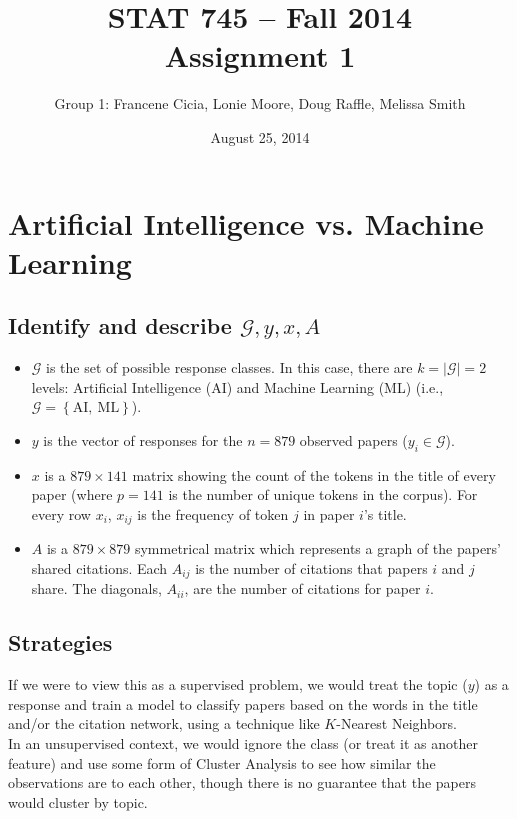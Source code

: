 \documentclass[a4paper]{article}
\title{\vspace{-30pt}STAT 745 -- Fall 2014\\Assignment 1}
\author{Group 1: Francene Cicia, Lonie Moore, Doug Raffle, Melissa Smith}
\date{August 25, 2014}
\begin{document}
\setlength{\parindent}{0pt}
\vspace{-50pt}
\maketitle

\section{Artificial Intelligence vs. Machine Learning}

\subsection{Identify and describe $\mathcal{G}, y, x, A$}
\begin{itemize}
  \item $\mathcal{G}$ is the set of possible response classes.  In
    this case, there are
    $k=|\mathcal{G}|=2$ levels:
    Artificial Intelligence (AI) and
    Machine Learning (ML) (i.e., $\mathcal{G} = \left\{\text{AI}, \:\text{ML} \right\}$).
  \item $y$ is the vector of responses for the
    $n = 879$ observed papers ($y_i \in \mathcal{G}$).
  \item $x$ is a $879\times141$ matrix
    showing the count of the tokens in the title of every paper (where
    $p=141$ is the number of unique tokens in the corpus).
    For every row $x_i$, $x_{ij}$ is the frequency of token $j$ in
    paper $i$'s title.
  \item $A$ is a $879\times879$ symmetrical matrix which
    represents a graph of the papers' shared citations.  Each
    $A_{ij}$ is the number of citations that papers $i$ and $j$ share.  The diagonals,
    $A_{ii}$, are the number of citations for paper $i$.
\end{itemize}

\subsection{Strategies}
If we were to view this as a supervised problem, we would treat the topic ($y$) as
a response and train a model to classify papers based on
the words in the title and/or the citation network, using a technique like $K$-Nearest Neighbors.\\

In an unsupervised context, we would ignore the class (or
treat it as another feature) and use some form of Cluster
Analysis to see how similar the observations are to each other, though
there is no guarantee that the papers would cluster by topic.
\end{document}

